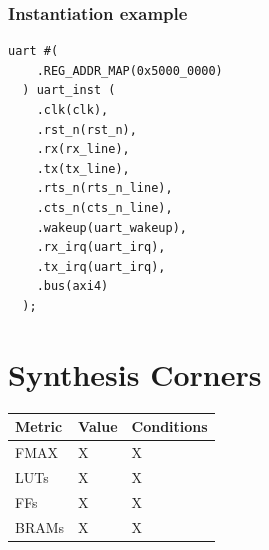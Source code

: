 \documentclass[12pt]{article}
\begin{document}
\subsubsection{Instantiation example}
\begin{lstlisting}[caption={UART Module Instantiation}]
  uart #(
    .REG_ADDR_MAP(0x5000_0000)
  ) uart_inst (
    .clk(clk),
    .rst_n(rst_n),
    .rx(rx_line),
    .tx(tx_line),
    .rts_n(rts_n_line),
    .cts_n(cts_n_line),
    .wakeup(uart_wakeup),
    .rx_irq(uart_irq),
    .tx_irq(uart_irq),
    .bus(axi4)
  );
  \end{lstlisting}

\section{Synthesis Corners}

\noindent \begin{tabular}{|p{2cm}|p{2cm}|p{9cm}|}
  \hline
  \rowcolor{light-gray}\textbf{Metric} & \textbf{Value} & \textbf{Conditions} \\
  \hline
  FMAX & X & X \\
  \hline
  LUTs & X & X \\
  \hline
  FFs & X & X \\
  \hline
  BRAMs & X & X \\
  \hline
\end{tabular} \\~\\
\end{document}
